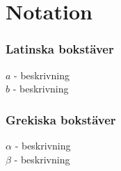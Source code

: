 \chapter*{Notation}

\subsection*{Latinska bokstäver}

$a$ - beskrivning\\
$b$ - beskrivning

\subsection*{Grekiska bokstäver}

$\alpha$ - beskrivning\\
$\beta$ - beskrivning
